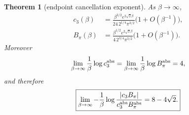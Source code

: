 \documentclass[11pt]{article}
\newtheorem{theorem}{Theorem}
\theoremstyle{definition}
\theoremstyle{remark}
\begin{document}
\begin{theorem}[endpoint cancellation exponent]\label{thm:exponent}
As $\beta\to\infty$,
\begin{align}
 c_3(\beta)&=\frac{\beta^{3/2}e^{2\sqrt2\beta}}
  {24\,2^{1/4}\pi^{3/2}}\bigl(1+O(\beta^{-1})\bigr),
  \label{eq:c3asymp}\\
 B_\pi(\beta)&=\frac{\beta^{1/2}e^{2\sqrt2\beta}}
  {4\,2^{3/4}\pi^{3/2}}\bigl(1+O(\beta^{-1})\bigr).
  \label{eq:bpiasymp}
\end{align}
Moreover
\begin{equation}\label{eq:absrate}
 \lim_{\beta\to\infty}\frac{1}{\beta}\log c_3^{\rm abs}
 =\lim_{\beta\to\infty}\frac{1}{\beta}\log B_\pi^{\rm abs}=4,
\end{equation}
and therefore
\begin{equation}\label{eq:loss}
 \boxed{\displaystyle
 \lim_{\beta\to\infty}-\frac{1}{\beta}\log
 \frac{|c_3B_\pi|}{c_3^{\rm abs}B_\pi^{\rm abs}}
 =8-4\sqrt2.}
\end{equation}
\end{theorem}
\end{document}
